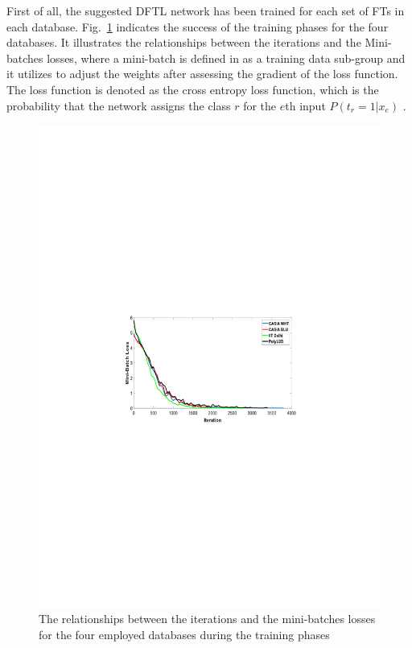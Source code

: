 \documentclass[conference]{IEEEtran}
\begin{document}
First of all, the suggested DFTL network has been trained for each set of FTs in each database. Fig.~\ref{fig:Training_curves} indicates the success of the training phases for the four databases. It illustrates the relationships between the iterations and the Mini-batches losses, where a mini-batch is defined in \cite{beale1992neural} as a training data sub-group and it utilizes to adjust the weights after assessing the gradient of the loss function. The loss function is denoted as the cross entropy loss function, which is the probability that the network assigns the class $r$ for the $e$th input $P(t_r=1|x_e)$ \cite{beale1992neural}.
\begin{figure}[!b]
    \centering
    \includegraphics[page=1,scale=.8,trim=5cm 11.25cm 5cm 11.25cm,clip]{Iteration_vs_Loss_All_Databases.pdf}
    \caption{The relationships between the iterations and the mini-batches losses for the four employed databases during the training phases}
    \label{fig:Training_curves}
\end{figure}
\end{document}
